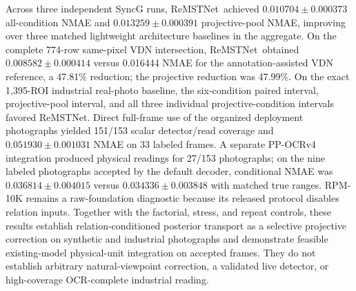 \documentclass[electronics,article,submit,oneauthor]{Definitions/mdpi}
\newcommand{\modelname}{ReMSTNet}
\begin{document}
Across three independent SyncG runs, \modelname\ achieved $0.010704\pm0.000373$ all-condition NMAE and $0.013259\pm0.000391$ projective-pool NMAE, improving over three matched lightweight architecture baselines in the aggregate. On the complete 774-row same-pixel VDN intersection, \modelname\ obtained $0.008582\pm0.000414$ versus 0.016444 NMAE for the annotation-assisted VDN reference, a 47.81\% reduction; the projective reduction was 47.99\%. On the exact 1,395-ROI industrial real-photo baseline, the six-condition paired interval, projective-pool interval, and all three individual projective-condition intervals favored \modelname. Direct full-frame use of the organized deployment photographs yielded 151/153 scalar detector/read coverage and $0.051930\pm0.001031$ NMAE on 33 labeled frames. A separate PP-OCRv4 integration produced physical readings for 27/153 photographs; on the nine labeled photographs accepted by the default decoder, conditional NMAE was $0.036814\pm0.004015$ versus $0.034336\pm0.003848$ with matched true ranges. RPM-10K remains a raw-foundation diagnostic because its released protocol disables relation inputs. Together with the factorial, stress, and repeat controls, these results establish relation-conditioned posterior transport as a selective projective correction on synthetic and industrial photographs and demonstrate feasible existing-model physical-unit integration on accepted frames. They do not establish arbitrary natural-viewpoint correction, a validated live detector, or high-coverage OCR-complete industrial reading.

\vspace{6pt}




\end{document}
